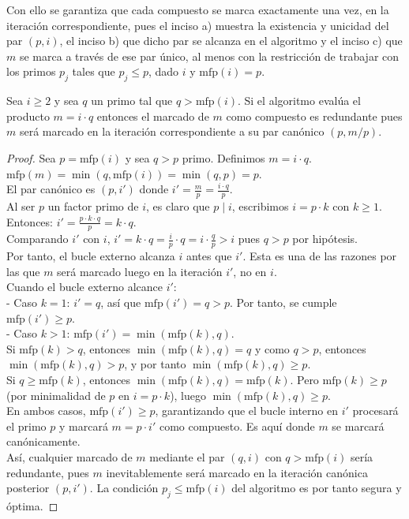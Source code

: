 Con ello se garantiza que cada compuesto se marca exactamente una vez, en la iteración correspondiente, pues el inciso a) muestra la existencia y unicidad del par $(p,i)$, el inciso b) que dicho par se alcanza en el algoritmo y el inciso c) que $m$ se marca a través de ese par único, al menos con la restricción de trabajar con los primos $p_j$ tales que $p_j \leq p$, dado $i$ y $\mathrm{mfp}(i) = p$.

\begin{enunciado}\label{enun:marcadoRedundante}\leavevmode\par
Sea $i \geq 2$  y sea $q$  un primo tal que $q > \mathrm{mfp}(i)$. Si el algoritmo evalúa el producto $m = i \cdot q$ entonces el marcado de $m$ como compuesto es redundante pues $m$ será marcado en la iteración correspondiente a su par canónico $(p,m/p)$.
\end{enunciado}

\begin{proof}
Sea $p = \text{mfp}(i)$ y sea $q > p$ primo. Definimos $m = i \cdot q$. \\
$\text{mfp}(m) = \min(q, \text{mfp}(i)) = \min(q, p) = p$. \\
El par canónico es $(p,i')$ donde $i' = \frac{m}{p} = \frac{i \cdot q}{p}$. \\
Al ser $p$ un factor primo de $i$, es claro que $p \mid i$, escribimos $i = p \cdot k$ con $k \geq 1$. Entonces:
$i' = \frac{p \cdot k \cdot q}{p} = k \cdot q$. \\
Comparando $i'$ con $i$, $i' = k \cdot q = \frac{i}{p} \cdot q = i \cdot \frac{q}{p} > i$ pues $q > p$ por hipótesis. \\
Por tanto, el bucle externo alcanza $i$ antes que $i'$. Esta es una de las razones por las que $m$ será marcado luego en la iteración $i'$, no en $i$.\\
Cuando el bucle externo alcance $i'$: \\
- Caso $k = 1$: $i' = q$, así que $\text{mfp}(i') = q > p$. Por tanto, se cumple $\text{mfp}(i') \geq p$. \\
- Caso $k > 1$: $\text{mfp}(i') = \min(\text{mfp}(k), q)$. \\
Si $\text{mfp}(k) > q$, entonces $\min(\text{mfp}(k), q) = q$ y como $q > p$, entonces $\min(\text{mfp}(k), q) > p$, y por tanto $\min(\text{mfp}(k), q) \geq p$. \\
Si $q \geq \text{mfp}(k)$, entonces $\min(\text{mfp}(k), q) = \text{mfp}(k)$. Pero $\text{mfp}(k) \geq p$ (por minimalidad de $p$ en $i = p \cdot k$), luego $\min(\text{mfp}(k), q) \geq p$. \\
En ambos casos, $\text{mfp}(i') \geq p$, garantizando que el bucle interno en $i'$ procesará el primo $p$ y marcará $m = p \cdot i'$ como compuesto. Es aquí donde $m$ se marcará canónicamente.\\
Así, cualquier marcado de $m$ mediante el par $(q, i)$ con $q > \text{mfp}(i)$ sería redundante, pues $m$ inevitablemente será marcado en la iteración canónica posterior $(p, i')$. La condición $p_j \leq \text{mfp}(i)$ del algoritmo es por tanto segura y óptima.
\end{proof}

